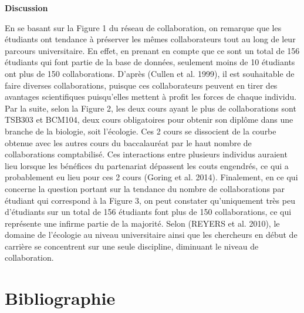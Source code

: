 \documentclass[
]{article}
\begin{document}
\textbf{Discussion}

En se basant sur la Figure 1 du réseau de collaboration, on remarque que
les étudiants ont tendance à préserver les mêmes collaborateurs tout au
long de leur parcours universitaire. En effet, en prenant en compte que
ce sont un total de 156 étudiants qui font partie de la base de données,
seulement moins de 10 étudiants ont plus de 150 collaborations. D'après
(Cullen et al. 1999), il est souhaitable de faire diverses
collaborations, puisque ces collaborateurs peuvent en tirer des
avantages scientifiques puisqu'elles mettent à profit les forces de
chaque individu. Par la suite, selon la Figure 2, les deux cours ayant
le plus de collaborations sont TSB303 et BCM104, deux cours obligatoires
pour obtenir son diplôme dans une branche de la biologie, soit
l'écologie. Ces 2 cours se dissocient de la courbe obtenue avec les
autres cours du baccalauréat par le haut nombre de collaborations
comptabilisé. Ces interactions entre plusieurs individus auraient lieu
lorsque les bénéfices du partenariat dépassent les couts engendrés, ce
qui a probablement eu lieu pour ces 2 cours (Goring et al. 2014).
Finalement, en ce qui concerne la question portant sur la tendance du
nombre de collaborations par étudiant qui correspond à la Figure 3, on
peut constater qu'uniquement très peu d'étudiants sur un total de 156
étudiants font plus de 150 collaborations, ce qui représente une infirme
partie de la majorité. Selon (REYERS et al. 2010), le domaine de
l'écologie au niveau universitaire ainsi que les chercheurs en début de
carrière se concentrent sur une seule discipline, diminuant le niveau de
collaboration.

\hypertarget{bibliographie}{%
\section*{Bibliographie}\label{bibliographie}}

\hfill\break

\hfill\break
\end{document}
